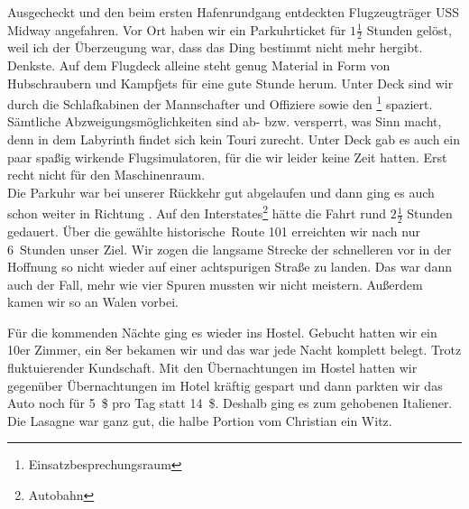 Ausgecheckt und den beim ersten Hafenrundgang entdeckten Flugzeugträger USS Midway angefahren.
Vor Ort haben wir ein Parkuhrticket für $1 \frac{1}{2}$ Stunden gelöst, weil ich der Überzeugung war, dass das Ding bestimmt nicht mehr hergibt.
Denkste.
Auf dem Flugdeck alleine steht genug Material in Form von Hubschraubern und Kampfjets für eine gute Stunde herum.
Unter Deck sind wir durch die Schlafkabinen der Mannschafter und Offiziere sowie den \footnote{Einsatzbesprechungsraum} spaziert.
Sämtliche Abzweigungsmöglichkeiten sind ab- bzw. versperrt, was Sinn macht, denn in dem Labyrinth findet sich kein Touri zurecht.
Unter Deck gab es auch ein paar spaßig wirkende Flugsimulatoren, für die wir leider keine Zeit hatten.
Erst recht nicht für den Maschinenraum.\\

Die Parkuhr war bei unserer Rückkehr gut abgelaufen und dann ging es auch schon weiter in Richtung .
Auf den Interstates\footnote{Autobahn} hätte die Fahrt rund $2 \frac{1}{2}$ Stunden gedauert.
Über die gewählte \glqq historische\grqq \, Route 101 erreichten wir nach nur 6~Stunden unser Ziel.
Wir zogen die langsame Strecke der schnelleren vor in der Hoffnung so nicht wieder auf einer achtspurigen Straße zu landen.
Das war dann auch der Fall, mehr wie vier Spuren mussten wir nicht meistern.
Außerdem kamen wir so an Walen vorbei.


\vspace*{.3\paperheight}

Für die kommenden Nächte ging es wieder ins Hostel.
Gebucht hatten wir ein 10er Zimmer, ein 8er bekamen wir und das war jede Nacht komplett belegt.
Trotz fluktuierender Kundschaft.
Mit den Übernachtungen im Hostel hatten wir gegenüber Übernachtungen im Hotel kräftig gespart und dann parkten wir das Auto noch für 5~\$ pro Tag statt 14~\$.
Deshalb ging es zum gehobenen Italiener.
Die Lasagne war ganz gut, die halbe Portion vom Christian ein Witz.
